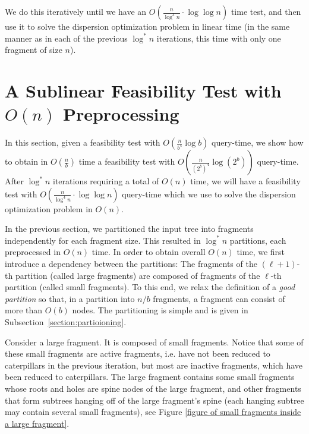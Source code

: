 \documentclass[11pt,a4paper]{article}
\theoremstyle{definition}
\theoremstyle{remark}
\begin{document}
We do this iteratively until we have an $O(\frac{n}{\log ^3n} \cdot \log \log n)$ time test, and then use it to
solve the dispersion optimization problem in linear time (in the same manner as in each of the previous
$\log ^*n$ iterations, this time with only one fragment of size $n$).


\section{A Sublinear Feasibility Test with \boldmath
\boldmath$O(n)$ Preprocessing}\label{sectionLinear}


In this section, given a feasibility test with $O(\frac{n}{b^4}\log b)$ query-time, we show how to obtain in $O(\frac{n}{b})$ time a feasibility test with $O(\frac{n}{(2^b)^{4}}\log (2^b))$ query-time.
After $\log ^*n$ iterations requiring a total of $O(n)$ time, we will have a feasibility test with $O(\frac{n}{\log ^4n} \cdot \log \log n)$ query-time
which we use to solve the dispersion optimization problem in $O(n)$. 


In the previous section, we partitioned the input tree into fragments independently for each fragment size. This resulted in $\log^{*}n$ partitions, each preprocessed in $O(n)$ time. In order to obtain overall $O(n)$ time, we first introduce a dependency between the partitions: The fragments of the $(\ell+1)$-th partition (called large fragments) are composed of fragments of the $\ell$-th partition (called small fragments). To this end, we relax the definition of a {\em good partition} so that, in a partition into $n/b$ fragments, a fragment can consist of more than $O(b)$ nodes. The partitioning is simple and is given in Subsection~\ref{section:partioioning}.  

Consider a large fragment. It is composed of small fragments. Notice that some of these small fragments are active fragments, i.e. have not been reduced to caterpillars in the previous iteration, but most are inactive fragments, which have
been reduced to caterpillars. The large fragment contains some small fragments whose roots and holes are spine nodes of the large fragment,
and other fragments that form subtrees hanging off of the large fragment's spine (each hanging subtree may
contain several small fragments), see Figure \ref{figure of small fragments inside a large fragment}.
\end{document}
